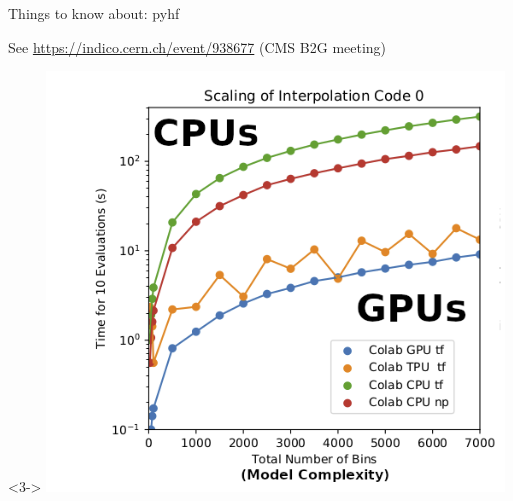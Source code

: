 \documentclass[aspectratio=169]{beamer}
\begin{document}
\begin{frame}{Things to know about: pyhf}
\begin{uncoverenv}
\vspace{0.2 cm}
\small
See \textcolor{blue}{\url{https://indico.cern.ch/event/938677}} (CMS B2G meeting)
\end{uncoverenv}

\begin{uncoverenv}<3->
\vspace{-3.9 cm}
\hfill \includegraphics[height=4 cm]{pyhf-gpu.png}
\end{uncoverenv}
\end{frame}
\end{document}
